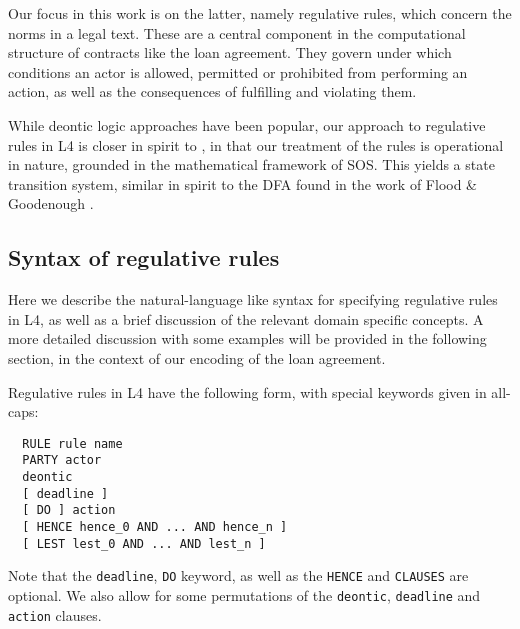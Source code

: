 \documentclass{article}
\begin{document}
Our focus in this work is on the latter, namely regulative rules, which concern
the norms in a legal text.
These are a central component in the computational structure of contracts like
the loan agreement.
They govern under which conditions an actor is allowed,
permitted or prohibited from performing an action, as well as the consequences
of fulfilling and violating them.


While deontic logic approaches have been popular,
our approach to regulative rules in L4 is closer in spirit to
\cite{real_time_contract_automata, normative_diags_diogo},
in that our treatment of the rules is operational in nature, grounded in the
mathematical framework of SOS.
This yields a state transition system, similar in spirit to the DFA found in
the work of Flood \& Goodenough \cite{contract_as_automaton}.

\subsection{Syntax of regulative rules}
Here we describe the natural-language like syntax for specifying regulative
rules in L4, as well as a brief discussion of the relevant domain specific
concepts.
A more detailed discussion with some examples will be provided in the following
section, in the context of our encoding of the loan agreement.

Regulative rules in L4 have the following form, with special keywords given
in all-caps:
\begin{lstlisting}
  RULE rule name
  PARTY actor
  deontic
  [ deadline ]
  [ DO ] action
  [ HENCE hence_0 AND ... AND hence_n ]
  [ LEST lest_0 AND ... AND lest_n ]
\end{lstlisting}

Note that the \texttt{deadline}, \texttt{DO} keyword, as well as the
\texttt{HENCE} and \texttt{CLAUSES} are optional.
We also allow for some permutations of the \texttt{deontic}, \texttt{deadline}
and \texttt{action} clauses.
\end{document}
